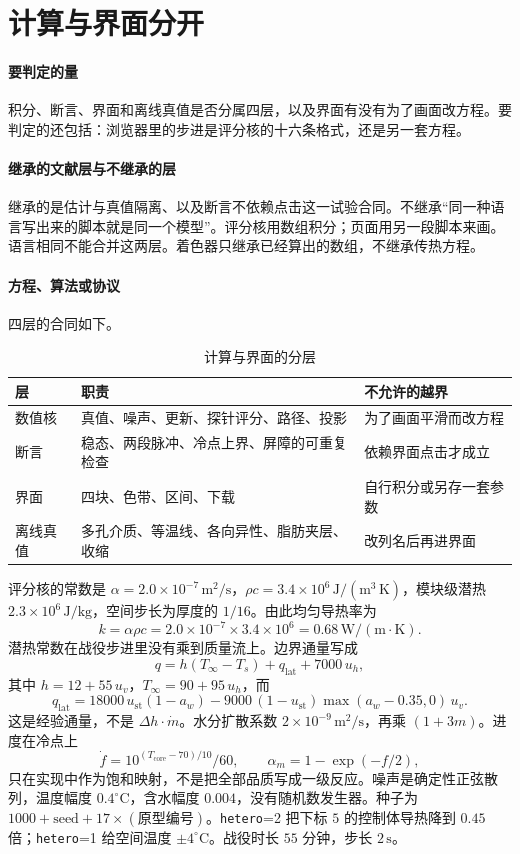 \section{计算与界面分开}

\paragraph{要判定的量}
积分、断言、界面和离线真值是否分属四层，以及界面有没有为了画面改方程。要判定的还包括：浏览器里的步进是评分核的十六条格式，还是另一套方程。

\paragraph{继承的文献层与不继承的层}
继承的是估计与真值隔离、以及断言不依赖点击这一试验合同。不继承“同一种语言写出来的脚本就是同一个模型”。评分核用数组积分；页面用另一段脚本来画。语言相同不能合并这两层。着色器只继承已经算出的数组，不继承传热方程。

\paragraph{方程、算法或协议}
四层的合同如下。

\begin{table}[ht]
\centering
\caption{计算与界面的分层}
\begin{tabularx}{\textwidth}{lXX}
\toprule
层 & 职责 & 不允许的越界 \\
\midrule
数值核 & 真值、噪声、更新、探针评分、路径、投影 & 为了画面平滑而改方程 \\
断言 & 稳态、两段脉冲、冷点上界、屏障的可重复检查 & 依赖界面点击才成立 \\
界面 & 四块、色带、区间、下载 & 自行积分或另存一套参数 \\
离线真值 & 多孔介质、等温线、各向异性、脂肪夹层、收缩 & 改列名后再进界面 \\
\bottomrule
\end{tabularx}
\end{table}

评分核的常数是 $\alpha=2.0\times 10^{-7}\,\mathrm{m^2/s}$，$\rho c=3.4\times 10^{6}\,\mathrm{J/(m^3\,K)}$，模块级潜热 $2.3\times 10^{6}\,\mathrm{J/kg}$，空间步长为厚度的 $1/16$。由此均匀导热率为
\[
k=\alpha\rho c=2.0\times 10^{-7}\times 3.4\times 10^{6}=0.68\,\mathrm{W/(m\cdot K)}.
\]
潜热常数在战役步进里没有乘到质量流上。边界通量写成
\[
q=h(T_\infty-T_s)+q_{\mathrm{lat}}+7000\,u_h,
\]
其中 $h=12+55\,u_v$，$T_\infty=90+95\,u_h$，而
\[
q_{\mathrm{lat}}=18000\,u_{\mathrm{st}}(1-a_w)-9000\,(1-u_{\mathrm{st}})\max(a_w-0.35,0)\,u_v.
\]
这是经验通量，不是 $\Delta h\cdot\dot m$。水分扩散系数 $2\times 10^{-9}\,\mathrm{m^2/s}$，再乘 $(1+3m)$。进度在冷点上
\[
\dot f=10^{(T_{\mathrm{core}}-70)/10}/60,\qquad \alpha_m=1-\exp(-f/2),
\]
只在实现中作为饱和映射，不是把全部品质写成一级反应。噪声是确定性正弦散列，温度幅度 $0.4^\circ\mathrm{C}$，含水幅度 $0.004$，没有随机数发生器。种子为 $1000+\mathrm{seed}+17\times(\text{原型编号})$。\texttt{hetero}=2 把下标 $5$ 的控制体导热降到 $0.45$ 倍；\texttt{hetero}=1 给空间温度 $\pm 4^\circ\mathrm{C}$。战役时长 $55$ 分钟，步长 $2\,\mathrm{s}$。

